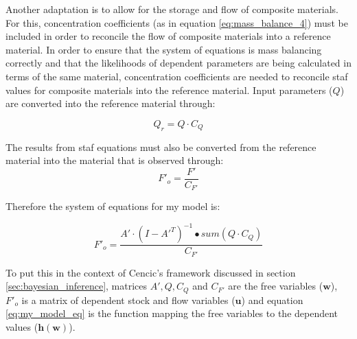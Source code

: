 \documentclass[ %
                    author={Tom Jager},
                supervisor={Dr. Daniel Schien},
                    degree={MEng},
                     title={A Bayesian Inference Engine for Calibrating Uncertainty over UMIS Structured MFA Systems},
                  subtitle={},
                      type={research},
                      year={2019} ]{dissertation}
\begin{document}
Another adaptation is to allow for the storage and flow of composite materials. For this, concentration coefficients (as in equation \ref{eq:mass_balance_4}) must be included in order to reconcile the flow of composite materials into a reference material. In order to ensure that the system of equations is mass balancing correctly and that the likelihoods of dependent parameters are being calculated in terms of the same material, concentration coefficients are needed to reconcile staf values for composite materials into the reference material. Input parameters ($Q$) are converted into the reference material through:

\begin{equation}
    Q_r = Q \cdot {C_{Q}}
\end{equation}

The results from staf equations must also be converted from the reference material into the material that is observed through:
\begin{equation}
    F'_o = \frac{F'}{C_{F'}}
\end{equation}


Therefore the system of equations for my model is:

\begin{equation}
    F'_o = \frac{A' \cdot (I-A'^T)^{-1} \bullet sum(Q \cdot C_Q)}{C_{F'}}
    \label{eq:my_model_eq}
\end{equation}

To put this in the context of Cencic's framework discussed in section \ref{sec:bayesian_inference}, matrices $A', Q, C_Q$ and $C_{F'}$ are the free variables ($\bm{w}$), $F'_o$ is a matrix of dependent stock and flow variables ($\bm{u}$) and equation \ref{eq:my_model_eq} is the function mapping the free variables to the dependent values ($\bm{h}(\bm{w})$). 


\end{document}
